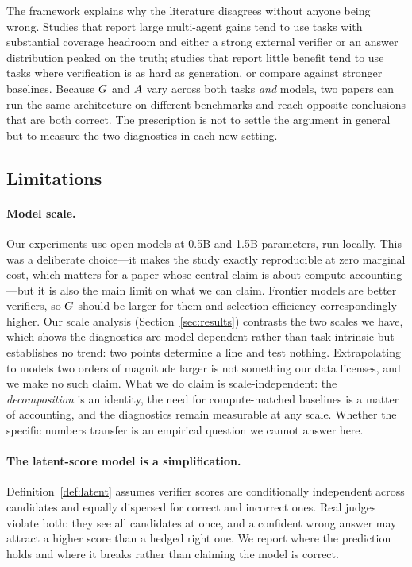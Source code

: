 The framework explains why the literature disagrees without anyone being wrong.
Studies that report large multi-agent gains tend to use tasks with substantial
coverage headroom and either a strong external verifier or an answer
distribution peaked on the truth; studies that report little benefit tend to use
tasks where verification is as hard as generation, or compare against stronger
baselines. Because $G$ and $A$ vary across both tasks \emph{and} models,
two papers can run the same architecture on different benchmarks and reach
opposite conclusions that are both correct. The prescription is not to settle
the argument in general but to measure the two diagnostics in each new setting.

\subsection{Limitations}
\label{sec:limitations}

\paragraph{Model scale.} Our experiments use open models at 0.5B and 1.5B parameters, run locally. This was a deliberate choice---it makes the study
exactly reproducible at zero marginal cost, which matters for a paper whose
central claim is about compute accounting---but it is also the main limit on
what we can claim. Frontier models are better verifiers, so $G$ should be
larger for them and selection efficiency correspondingly higher. Our scale analysis (Section~\ref{sec:results}) contrasts the two scales we have, which shows the diagnostics are model-dependent rather than task-intrinsic but establishes no trend: two points determine a line and test nothing. Extrapolating to models two orders of magnitude larger is not something our data licenses, and we make no such claim. What we do claim is
scale-independent: the \emph{decomposition} is an identity, the need for
compute-matched baselines is a matter of accounting, and the diagnostics remain
measurable at any scale. Whether the specific numbers transfer is an empirical
question we cannot answer here.

\paragraph{The latent-score model is a simplification.} Definition~\ref{def:latent}
assumes verifier scores are conditionally independent across candidates and
equally dispersed for correct and incorrect ones. Real judges violate both:
they see all candidates at once, and a confident wrong answer may attract a
higher score than a hedged right one. We report where the prediction holds and
where it breaks rather than claiming the model is correct.

